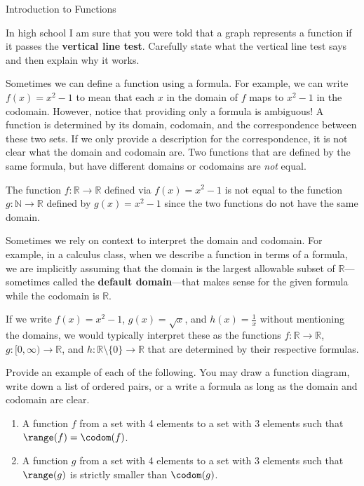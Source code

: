 \begin{section}{Introduction to Functions}
\begin{problem}
In high school I am sure that you were told that a graph represents a function if it passes the \textbf{vertical line test}.  Carefully state what the vertical line test says and then explain why it works.
\end{problem}

Sometimes we can define a function using a formula. For example, we can write $f(x)=x^2-1$ to mean that each $x$ in the domain of $f$ maps to $x^2-1$ in the codomain. However, notice that providing only a formula is ambiguous!  A function is determined by its domain, codomain, and the correspondence between these two sets. If we only provide a description for the correspondence, it is not clear what the domain and codomain are.  Two functions that are defined by the same formula, but have different domains or codomains are \emph{not} equal.  

\begin{example}
The function $f:\mathbb{R}\to \mathbb{R}$ defined via $f(x)=x^{2}-1$ is not equal to the function $g:\mathbb{N}\to\mathbb{R}$ defined by $g(x)=x^{2}-1$ since the two functions do not have the same domain.
\end{example}

Sometimes we rely on context to interpret the domain and codomain.  For example, in a calculus class, when we describe a function in terms of a formula, we are implicitly assuming that the domain is the largest allowable subset of $\mathbb{R}$---sometimes called the \textbf{default domain}---that makes sense for the given formula while the codomain is $\mathbb{R}$. 

\begin{example}
If we write $f(x)=x^2-1$, $g(x)=\sqrt{x}$, and $h(x)=\frac{1}{x}$ without mentioning the domains, we would typically interpret these as the functions $f:\mathbb{R}\to \mathbb{R}$, $g:[0,\infty)\to \mathbb{R}$, and $h:\mathbb{R}\setminus \{0\}\to \mathbb{R}$ that are determined by their respective formulas.
\end{example}

\begin{problem}
Provide an example of each of the following.  You may draw a function diagram, write down a list of ordered pairs, or a write a formula as long as the domain and codomain are clear.
\begin{enumerate}[label=\textrm{(\alph*)}]
\item A function $f$ from a set with 4 elements to a set with 3 elements such that $\range(f)=\codom(f)$.
\item A function $g$ from a set with 4 elements to a set with 3 elements such that $\range(g)$ is strictly smaller than $\codom(g)$.
\end{enumerate}
\end{problem}


\end{section}
